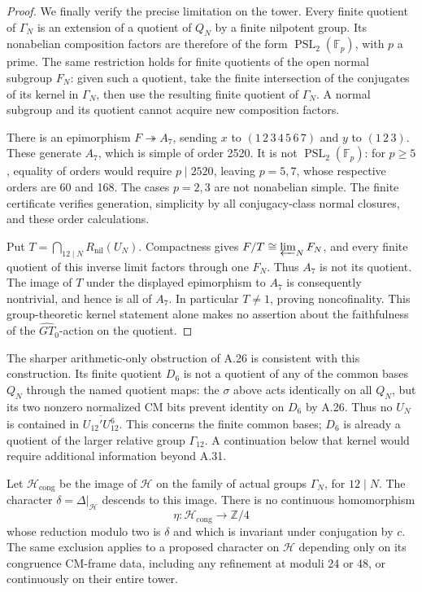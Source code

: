 \begin{proof}
We finally verify the precise limitation on the tower.
Every finite quotient of \(\Gamma_N\) is an extension
of a quotient of \(Q_N\) by a finite nilpotent group.
Its nonabelian composition factors are therefore of
the form \(\operatorname{PSL}_2(\mathbb F_p)\),
with \(p\) a prime. The same restriction holds for
finite quotients of the open normal subgroup \(F_N\):
given such a quotient, take the finite intersection
of the conjugates of its kernel in \(\Gamma_N\),
then use the resulting finite quotient of
\(\Gamma_N\). A normal subgroup and its quotient
cannot acquire new composition factors.

There is an epimorphism \(F\twoheadrightarrow A_7\),
sending \(x\) to \((1\,2\,3\,4\,5\,6\,7)\)
and \(y\) to \((1\,2\,3)\). These generate
\(A_7\), which is simple of order 2520.
It is not \(\operatorname{PSL}_2(\mathbb F_p)\):
for \(p\ge5\), equality of orders would require
\(p\mid2520\), leaving \(p=5,7\), whose respective
orders are 60 and 168. The cases \(p=2,3\)
are not nonabelian simple. The finite certificate
 verifies
generation, simplicity by all conjugacy-class normal
closures, and these order calculations.

Put \(T=\bigcap_{12\mid N}R_{\mathrm{nil}}(U_N)\).
Compactness gives
\(F/T\cong\varprojlim_NF_N\), and every finite
quotient of this inverse limit factors through one
\(F_N\). Thus \(A_7\) is not its quotient.
The image of \(T\) under the displayed epimorphism
to \(A_7\) is consequently nontrivial, and hence
is all of \(A_7\). In particular \(T\ne1\),
proving noncofinality. This group-theoretic kernel
statement alone makes no assertion about the
faithfulness of the \(\widehat{GT}_0\)-action
on the quotient.
\end{proof}

The sharper arithmetic-only obstruction of A.26 is
consistent with this construction. Its finite
quotient \(D_6\) is not a quotient of any of the
common bases \(Q_N\) through the named quotient
maps: the \(\sigma\) above acts identically on all
\(Q_N\), but its two nonzero normalized CM bits
prevent identity on \(D_6\) by A.26.
Thus no \(U_N\) is contained in
\(\overline{U_{12}'U_{12}^6}\).
This concerns the finite common bases; \(D_6\)
is already a quotient of the larger relative group
\(\Gamma_{12}\). A continuation below that kernel
would require additional information beyond A.31.

Let \(\mathcal H_{\mathrm{cong}}\) be the image of
\(\mathcal H\) on the family of actual groups
\(\Gamma_N\), for \(12\mid N\). The character
\(\delta=\Delta|_{\mathcal H}\) descends to this
image. There is no continuous homomorphism
\[
 \eta:\mathcal H_{\mathrm{cong}}\longrightarrow
             \mathbb Z/4
\]
whose reduction modulo two is \(\delta\) and
which is invariant under conjugation by \(c\).
The same exclusion applies to a proposed character
on \(\mathcal H\) depending only on its congruence
CM-frame data, including any refinement at moduli
24 or 48, or continuously on their entire tower.

